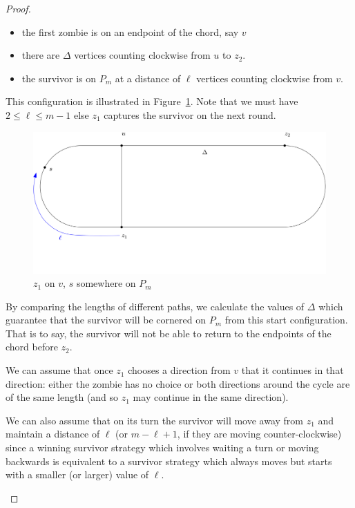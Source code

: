 \begin{proof}
\begin{proofpart}
  \begin{itemize}
   \item the first zombie is on an endpoint of the chord, say $v$
   \item there are $\Delta$ vertices counting clockwise from $u$ to $z_2$.
   \item the survivor is on $P_m$ at a distance of $\ell$ vertices counting
   clockwise from $v$.
  \end{itemize}

  This configuration is illustrated in Figure~\ref{fig:onthechord}.
  Note that we must have $2 \leq \ell \leq m-1$ else $z_1$ captures the survivor on the next round.

  \begin{figure}
    \centering
    \includegraphics[scale=0.5]{q_m_n/diagram1}
    \caption{$z_1$ on $v$, $s$ somewhere on $P_m$ \label{fig:onthechord}}
  \end{figure}

  By comparing the lengths of different paths, we calculate the values of $\Delta$
  which guarantee that the survivor will be cornered on $P_m$ from this start configuration. That is to say,
  the survivor will not be able to return to the endpoints of the chord before $z_2$.

  We can assume that once $z_1$ chooses a direction from $v$
  that it continues in that direction:
  either the zombie has no choice or both directions around
  the cycle are of the same length (and so
  $z_1$ may continue in the same direction).

  We can also assume that on its turn the survivor will move away from
  $z_1$ and maintain a distance of $\ell$ (or $m-\ell +1$, if they are moving counter-clockwise)
  since a winning survivor strategy which involves waiting a turn
  or moving backwards is equivalent to a survivor strategy
  which always moves but starts with a smaller (or larger) value of $\ell$.


\end{proofpart}
\end{proof}
